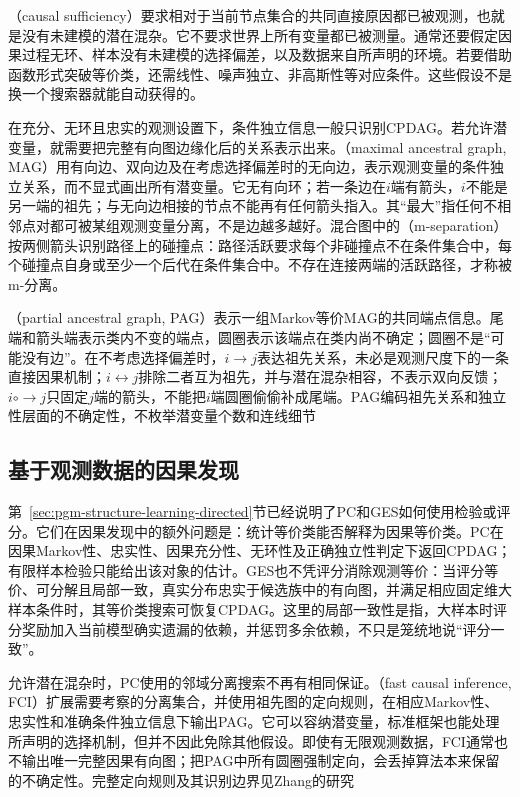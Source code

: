 （causal sufficiency）要求相对于当前节点集合的共同直接原因都已被观测，也就是没有未建模的潜在混杂。它不要求世界上所有变量都已被测量。通常还要假定因果过程无环、样本没有未建模的选择偏差，以及数据来自所声明的环境。若要借助函数形式突破等价类，还需线性、噪声独立、非高斯性等对应条件。这些假设不是换一个搜索器就能自动获得的。

在充分、无环且忠实的观测设置下，条件独立信息一般只识别CPDAG。若允许潜变量，就需要把完整有向图边缘化后的关系表示出来。（maximal ancestral graph, MAG）用有向边、双向边及在考虑选择偏差时的无向边，表示观测变量的条件独立关系，而不显式画出所有潜变量。它无有向环；若一条边在$i$端有箭头，$i$不能是另一端的祖先；与无向边相接的节点不能再有任何箭头指入。其“最大”指任何不相邻点对都可被某组观测变量分离，不是边越多越好。混合图中的（m-separation）按两侧箭头识别路径上的碰撞点：路径活跃要求每个非碰撞点不在条件集合中，每个碰撞点自身或至少一个后代在条件集合中。不存在连接两端的活跃路径，才称被m-分离。

（partial ancestral graph, PAG）表示一组Markov等价MAG的共同端点信息。尾端和箭头端表示类内不变的端点，圆圈表示该端点在类内尚不确定；圆圈不是“可能没有边”。在不考虑选择偏差时，$i\to j$表达祖先关系，未必是观测尺度下的一条直接因果机制；$i\leftrightarrow j$排除二者互为祖先，并与潜在混杂相容，不表示双向反馈；$i\mathbin{\circ\!\!\to}j$只固定$j$端的箭头，不能把$i$端圆圈偷偷补成尾端。PAG编码祖先关系和独立性层面的不确定性，不枚举潜变量个数和连线细节

\subsection{基于观测数据的因果发现}
\label{sec:pgm-structure-learning-observational}

第~\ref{sec:pgm-structure-learning-directed}节已经说明了PC和GES如何使用检验或评分。它们在因果发现中的额外问题是：统计等价类能否解释为因果等价类。PC在因果Markov性、忠实性、因果充分性、无环性及正确独立性判定下返回CPDAG；有限样本检验只能给出该对象的估计。GES也不凭评分消除观测等价：当评分等价、可分解且局部一致，真实分布忠实于候选族中的有向图，并满足相应固定维大样本条件时，其等价类搜索可恢复CPDAG。这里的局部一致性是指，大样本时评分奖励加入当前模型确实遗漏的依赖，并惩罚多余依赖，不只是笼统地说“评分一致”。

允许潜在混杂时，PC使用的邻域分离搜索不再有相同保证。（fast causal inference, FCI）扩展需要考察的分离集合，并使用祖先图的定向规则，在相应Markov性、忠实性和准确条件独立信息下输出PAG。它可以容纳潜变量，标准框架也能处理所声明的选择机制，但并不因此免除其他假设。即使有无限观测数据，FCI通常也不输出唯一完整因果有向图；把PAG中所有圆圈强制定向，会丢掉算法本来保留的不确定性。完整定向规则及其识别边界见Zhang的研究

